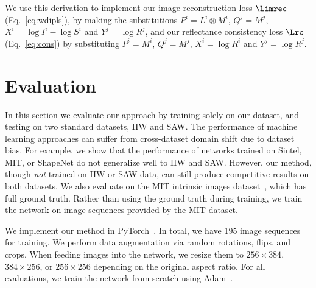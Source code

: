 \documentclass[10pt,twocolumn,letterpaper]{article}
\begin{document}
We use this derivation to implement our image reconstruction loss
$\Limrec$ (Eq.~\ref{eq:wdipls}), by making the substitutions $P^i =
L^i \otimes M^i$, $Q^j = M^j$, $X^i = \log I^i - \log S^i$ and $Y^j =
\log R^j$, and our reflectance consistency loss $\Lrc$
(Eq.~\ref{eq:cons}) by substituting $P^i = M^i$, $Q^j = M^j$, $X^i =
\log R^i$ and $Y^j = \log R^j$.



\section{Evaluation}\label{sec:eval}
In this section we evaluate our approach by training solely on our \BT
dataset, and testing on two standard datasets, IIW and SAW. The
performance of machine learning approaches can suffer from
cross-dataset domain shift due to dataset bias. For example, we show
that the performance of networks trained on Sintel, MIT, or ShapeNet
do not generalize well to IIW and SAW.
However, our method, though \emph{not} trained on IIW or SAW data,
can still produce competitive results on both datasets.
We also evaluate on the MIT intrinsic images
dataset~\cite{grosse2009ground}, which has full ground truth. Rather
than using the ground truth during training, we train the network on
image sequences provided by the MIT dataset. 

\smallskip{} We implement our method in
PyTorch~\cite{pytorch}. In total, we have 195 image sequences for
training. We perform data augmentation via random rotations, flips,
and crops. When feeding images into the network, we resize
them to $256\times 384$, $384\times 256$, or $256\times 256$ depending
on the original aspect ratio. For all evaluations, we train the
network from scratch using Adam~\cite{Kingma2014AdamAM}.
\end{document}
